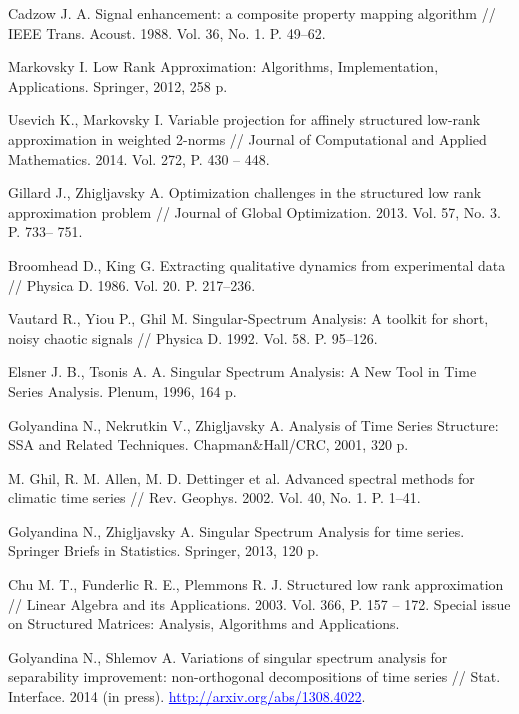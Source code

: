 \documentclass[12pt,a4paper,fleqn,leqno]{article}
\begin{document}
%
%
\begin{thebibliography}{10}
Cadzow J. A. Signal enhancement: a composite property mapping algorithm // IEEE
Trans. Acoust. 1988. Vol. 36, No. 1. P. 49–62.

Markovsky I. Low Rank Approximation: Algorithms, Implementation, Applications.
Springer, 2012, 258 p.

Usevich K., Markovsky I. Variable projection for affinely structured low-rank
approximation in weighted 2-norms // Journal of Computational and Applied
Mathematics. 2014. Vol. 272, P. 430 – 448.

Gillard J., Zhigljavsky A. Optimization challenges in the structured low rank
approximation problem // Journal of Global Optimization. 2013. Vol. 57, No. 3. P. 733–
751.

Broomhead D., King G. Extracting qualitative dynamics from experimental data //
Physica D. 1986. Vol. 20. P. 217–236.

Vautard R., Yiou P., Ghil M. Singular-Spectrum Analysis: A toolkit for short, noisy
chaotic signals // Physica D. 1992. Vol. 58. P. 95–126.

Elsner J. B., Tsonis A. A. Singular Spectrum Analysis: A New Tool in Time Series
Analysis. Plenum, 1996, 164 p.

Golyandina N., Nekrutkin V., Zhigljavsky A. Analysis of Time Series Structure: SSA and Related Techniques. Chapman\&Hall/CRC, 2001, 320 p.

M. Ghil, R. M. Allen, M. D. Dettinger et al. Advanced spectral methods for climatic time series // Rev. Geophys. 2002. Vol. 40, No. 1. P. 1–41.

Golyandina N., Zhigljavsky A. Singular Spectrum Analysis for time series. Springer Briefs
in Statistics. Springer, 2013, 120 p.

Chu M. T., Funderlic R. E., Plemmons R. J. Structured low rank approximation //
Linear Algebra and its Applications. 2003. Vol. 366, P. 157 – 172. Special issue on
Structured Matrices: Analysis, Algorithms and Applications.

Golyandina N., Shlemov A. Variations of singular spectrum analysis for separability
improvement: non-orthogonal decompositions of time series // Stat. Interface. 2014 (in press).
\textcolor{blue}{\underline{http://arxiv.org/abs/1308.4022}}.


\end{thebibliography}
\end{document}
